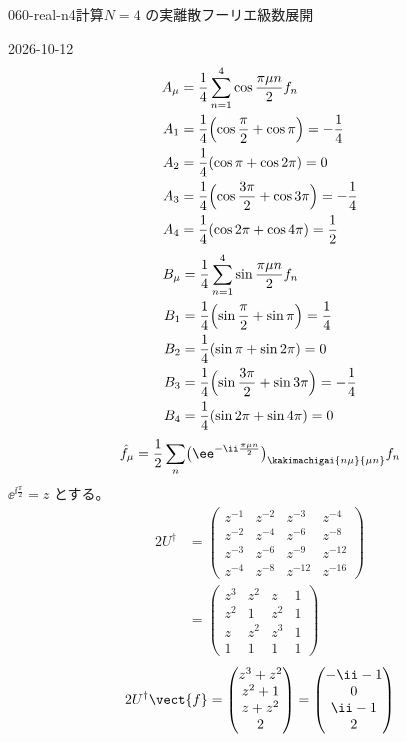 \documentclass[uplatex,dvipdfmx,a4paper,11pt]{jsarticle}
\begin{document}
\begin{mondai}{060-real-n4}{計算}{$N=4$ の実離散フーリエ級数展開}
\begin{kotaeutsushi}{2026-10-12}
\begin{align*}
  A_{\mu}&=\frac{1}{4}\sum_{n=1}^{4}\cos\frac{\pi\mu n}{2}f_n\\
  A_1&=\frac{1}{4}\Bigl(\cos\frac{\pi}{2}+\cos\pi\Bigr)=-\frac{1}{4}\\
  A_2&=\frac{1}{4}(\cos\pi+\cos2\pi)=0\\
  A_3&=\frac{1}{4}\Bigl(\cos\frac{3\pi}{2}+\cos3\pi\Bigr)=-\frac{1}{4}\\
  A_4&=\frac{1}{4}(\cos2\pi+\cos4\pi)=\frac{1}{2}
\end{align*}
\begin{align*}
  B_{\mu}&=\frac{1}{4}\sum_{n=1}^{4}\sin\frac{\pi\mu n}{2}f_n\\
  B_1&=\frac{1}{4}\Bigl(\sin\frac{\pi}{2}+\sin\pi\Bigr)=\frac{1}{4}\\
  B_2&=\frac{1}{4}(\sin\pi+\sin2\pi)=0\\
  B_3&=\frac{1}{4}\Bigl(\sin\frac{3\pi}{2}+\sin3\pi\Bigr)=-\frac{1}{4}\\
  B_4&=\frac{1}{4}(\sin2\pi+\sin4\pi)=0
\end{align*}
\[ \hat{f}_{\mu}=\frac{1}{2}\sum_{n}\bigl(\ee^{-\ii\frac{\pi\mu n}{2}}\bigr)_{\kakimachigai{n\mu}{\mu n}}f_n \]
$\ee^{\ii\frac{\pi}{2}}=z$ とする。
\begin{align*}
  2U^{\dagger}&=\begin{pmatrix}z^{-1}&z^{-2}&z^{-3}&z^{-4}\\z^{-2}&z^{-4}&z^{-6}&z^{-8}\\z^{-3}&z^{-6}&z^{-9}&z^{-12}\\z^{-4}&z^{-8}&z^{-12}&z^{-16}\end{pmatrix}\\
  &=\begin{pmatrix}z^{3}&z^{2}&z&1\\z^{2}&1&z^{2}&1\\z&z^{2}&z^{3}&1\\1&1&1&1\end{pmatrix}
\end{align*}
\[
  2U^{\dagger}\vect{f}=\begin{pmatrix}z^{3}+z^{2}\\z^{2}+1\\z+z^{2}\\2\end{pmatrix}=\begin{pmatrix}-\ii-1\\0\\\ii-1\\2\end{pmatrix}
\]
\end{kotaeutsushi}
\end{mondai}
\end{document}

